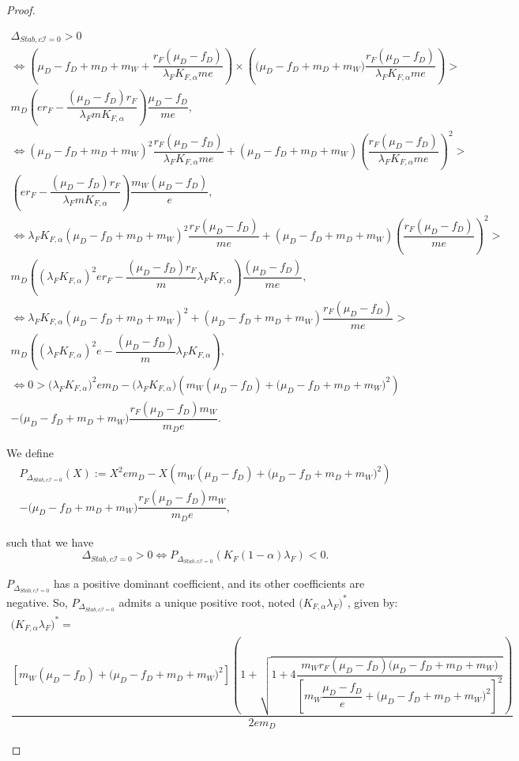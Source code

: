\documentclass{article}
\newcommand{\lfw}{\lambda_{F}}
\newcommand{\lfw}{\lambda_{F}}
\newcommand{\Kfa}{K_{F,\alpha}}
\newcommand{\cI}{c \mathcal{I}}
\begin{document}
\begin{proof}
\begin{itemize}
\begin{multline*}
\Delta_{Stab, \cI = 0} > 0 \\
\Leftrightarrow \left(\mu_D - f_D + m_D + m_W + \dfrac{r_F(\mu_D-f_D)}{\lfw \Kfa m e} \right) \times  \left(\big( \mu_D -f_D + m_D + m_W)\dfrac{r_F(\mu_D-f_D)}{\lfw \Kfa m e} \right) > \\ m_D\left(er_F - \dfrac{(\mu_D - f_D) r_F}{\lfw m \Kfa} \right) \dfrac{\mu_D - f_D}{m e}, \\
\Leftrightarrow \left(\mu_D - f_D + m_D + m_W \right)^2 \dfrac{r_F(\mu_D-f_D)}{\lfw \Kfa m e} + \left(\mu_D - f_D + m_D + m_W \right)\left(\dfrac{r_F(\mu_D-f_D)}{\lfw \Kfa m e} \right)^2 > \\ \left(er_F - \dfrac{(\mu_D - f_D) r_F}{\lfw m \Kfa} \right) \dfrac{m_W(\mu_D - f_D)}{e}, \\
\Leftrightarrow \lfw \Kfa \left(\mu_D - f_D + m_D + m_W \right)^2 \dfrac{r_F(\mu_D-f_D)}{m e} + \left(\mu_D - f_D + m_D + m_W \right)\left(\dfrac{r_F(\mu_D-f_D)}{m e} \right)^2 > \\m_D \left((\lfw \Kfa)^2 er_F - \dfrac{(\mu_D - f_D) r_F}{m}\lfw \Kfa  \right) \dfrac{(\mu_D - f_D)}{me}, \\
\Leftrightarrow \lfw \Kfa \left(\mu_D - f_D + m_D + m_W \right)^2 + \left(\mu_D - f_D + m_D + m_W \right)\dfrac{r_F(\mu_D-f_D)}{m e} > \\ m_D\left((\lfw \Kfa)^2 e - \dfrac{(\mu_D - f_D) }{m}\lfw \Kfa  \right), \\
\Leftrightarrow 0 > \Big(\lfw \Kfa \Big)^2 em_D -  \Big(\lfw \Kfa \Big) \left(m_W (\mu_D - f_D) + \big(\mu_D - f_D + m_D + m_W\big)^2 \right) \\ - \big(\mu_D - f_D + m_D + m_W\big) \dfrac{r_F (\mu_D - f_D)m_W}{m_D e}.
\end{multline*}

We define 
\begin{multline*}
P_{\Delta_{Stab, \cI = 0}}(X) := X^2 em_D -  X \left(m_W (\mu_D - f_D) + \big(\mu_D - f_D + m_D + m_W\big)^2 \right) \\ - \big(\mu_D - f_D + m_D + m_W\big) \dfrac{r_F (\mu_D - f_D)m_W}{m_D e},
\end{multline*} 

such that we have 
\begin{equation}
\Delta_{Stab, \cI = 0} > 0 \Leftrightarrow P_{\Delta_{Stab, \cI = 0}}(K_F(1-\alpha)\lfw) < 0.
\label{equivalenceDeltaStabP}
\end{equation}

$P_{\Delta_{Stab, \cI = 0}}$ has a positive dominant coefficient, and its other coefficients are negative. So,  $P_{\Delta_{Stab, \cI = 0}}$ admits a unique positive root, noted $\Big(\Kfa \lfw \Big)^*$, given by:
\begin{multline}
\Big(\Kfa \lfw \Big)^* = \\
 \dfrac{\left[m_{W}(\mu_{D}-f_{D})+\big(\mu_{D}-f_{D}+m_{D}+m_{W})^{2}\right]\left(1+\sqrt{1+4\dfrac{m_{W}r_{F}\left(\mu_{D}-f_{D}\right)\big(\mu_{D}-f_{D}+m_{D}+m_{W})}{\left[m_{W}\dfrac{\mu_{D}-f_{D}}{e}+\big(\mu_{D}-f_{D}+m_{D}+m_{W})^{2}\right]^{2}}}\right)}{2em_D}
\end{multline}


\end{itemize}
\end{proof}
\end{document}
